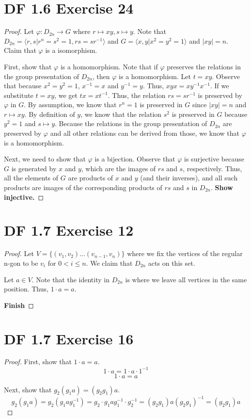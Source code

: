 \documentclass{article}
\begin{document}
\section{DF 1.6 Exercise 24}
\begin{proof}
Let $\varphi: D_{2n} \rightarrow G$ where $r \mapsto xy, s \mapsto y$. Note that $D_{2n} = \langle r, s | r^n = s^2 = 1, rs=sr^{-1} \rangle$ and $G=\langle x,y | x^2 = y^2 = 1 \rangle$ and $|xy|=n$. Claim that $\varphi$ is a isomorphism.

First, show that $\varphi$ is a homomorphism. Note that if $\varphi$ preserves the relations in the group presentation of $D_{2n}$, then $\varphi$ is a homomorphism. Let $t=xy$. Observe that because $x^2=y^2=1$, $x^{-1} = x$ and $y^{-1}=y$. Thus, $xyx=xy^{-1}x^{-1}$. If we substitute $t=xy$, we get $tx=xt^{-1}$. Thus, the relation $rs=sr^{-1}$ is preserved by $\varphi$ in $G$. By assumption, we know that $r^n=1$ is preserved in $G$ since $|xy|=n$ and $r \mapsto xy$. By definition of $y$, we know that the relation $s^2$ is preserved in $G$ because $y^2=1$ and $s \mapsto y$. Because the relations in the group presentation of $D_{2n}$ are preserved by $\varphi$ and all other relations can be derived from those, we know that $\varphi$ is a homomorphism.

Next, we need to show that $\varphi$ is a bijection. Observe that $\varphi$ is surjective because $G$ is generated by $x$ and $y$, which are the images of $rs$ and $s$, respectively. Thus, all the elements of $G$ are products of $x$ and $y$ (and their inverses), and all such products are images of the corresponding products of $rs$ and $s$ in $D_{2n}$. \textbf{Show injective.}
\end{proof}

\section{DF 1.7 Exercise 12}
\begin{proof}
Let $V = \{(v_1, v_2)...(v_{n-1}, v_{n})\}$ where we fix the vertices of the regular n-gon to be $v_i$ for $0 < i \leq n$. We claim that $D_{2n}$ acts on this set.

Let $a \in V$. Note that the identity in $D_{2n}$ is where we leave all vertices in the same position. Thus, $1 \cdot a = a$.

\textbf{Finish}


\end{proof}

\section{DF 1.7 Exercise 16}
\begin{proof}
First, show that $1 \cdot a = a$.
\[
1 \cdot a = 1 \cdot a \cdot 1^{-1}
\]
\[
1 \cdot a = a
\]

Next, show that $g_2(g_1a)=(g_2g_1)a$.
\[
g_2(g_1a) = g_2(g_1ag_1^{-1}) = g_2 \cdot g_1ag_1^{-1} \cdot g_2^{-1} =
(g_2g_1)a(g_2g_1)^{-1} = (g_2g_1)a
\]
\end{proof}
\end{document}
